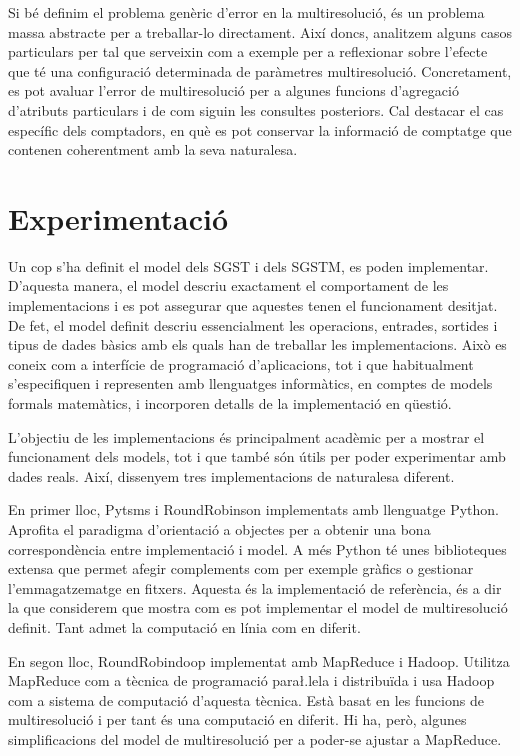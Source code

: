 Si bé definim el problema genèric d'error en la multiresolució, és un
problema massa abstracte per a treballar-lo directament. Així doncs,
analitzem alguns casos particulars per tal que serveixin com a exemple
per a reflexionar sobre l'efecte que té una configuració determinada
de paràmetres multiresolució. Concretament, es pot avaluar l'error de
multiresolució per a algunes funcions d'agregació d'atributs
particulars i de com siguin les consultes posteriors. Cal destacar el
cas específic dels comptadors, en què es pot conservar la informació
de comptatge que contenen coherentment amb la seva naturalesa.



\section{Experimentació}


Un cop s'ha definit el model dels \gls{SGST} i dels \gls{SGSTM}, es
poden implementar. D'aquesta manera, el model descriu exactament el
comportament de les implementacions i es pot assegurar que aquestes
tenen el funcionament desitjat.  De fet, el model definit descriu
essencialment les operacions, entrades, sortides i tipus de dades
bàsics amb els quals han de treballar les implementacions. Això es
coneix com a interfície de programació d'aplicacions, tot i que
habitualment s'especifiquen i representen amb llenguatges informàtics,
en comptes de models formals matemàtics, i incorporen detalls de la
implementació en qüestió.


L'objectiu de les implementacions és principalment acadèmic per a
mostrar el funcionament dels models, tot i que també són útils per
poder experimentar amb dades reals. Així, dissenyem tres
implementacions de naturalesa diferent. 



En primer lloc, Pytsms i RoundRobinson implementats amb llenguatge
Python.  Aprofita el paradigma d'orientació a objectes per a obtenir
una bona correspondència entre implementació i model. A més Python té
unes biblioteques extensa que permet afegir complements com per
exemple gràfics o gestionar l'emmagatzematge en fitxers.  Aquesta és
la implementació de referència, és a dir la que considerem que mostra
com es pot implementar el model de multiresolució definit.  Tant admet
la computació en línia com en diferit.

En segon lloc, RoundRobindoop implementat amb MapReduce i
Hadoop. Utilitza MapReduce com a tècnica de programació para\l.lela i
distribuïda i usa Hadoop com a sistema de computació d'aquesta
tècnica. Està basat en les funcions de multiresolució i per tant és
una computació en diferit. Hi ha, però, algunes simplificacions del
model de multiresolució per a poder-se ajustar a MapReduce.


